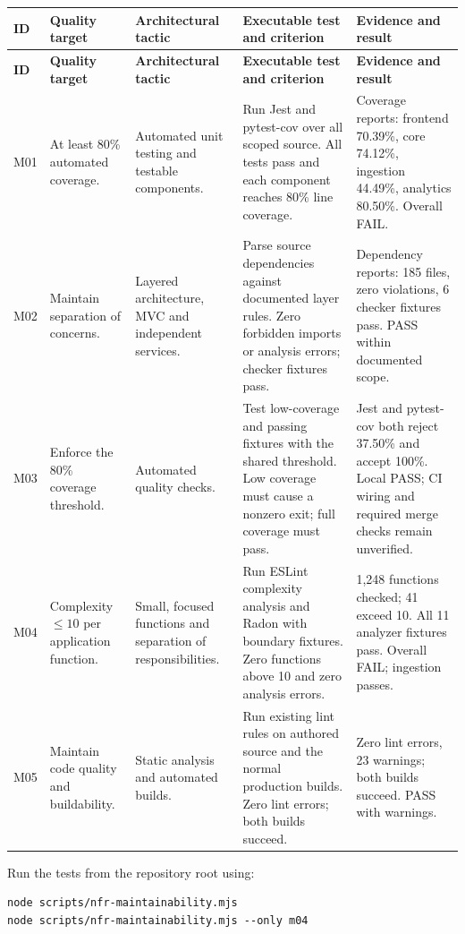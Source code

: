 \documentclass[12pt, a4paper]{article}
\begin{document}
\renewcommand{\arraystretch}{1.3}
\begin{longtable}{|p{}|p{}|p{}|p{}|p{}|}
\hline
\textbf{ID} & \textbf{Quality target} & \textbf{Architectural tactic} & \textbf{Executable test and criterion} & \textbf{Evidence and result} \\ \hline
\endfirsthead
\hline
\textbf{ID} & \textbf{Quality target} & \textbf{Architectural tactic} & \textbf{Executable test and criterion} & \textbf{Evidence and result} \\ \hline
\endhead
M01 & At least 80\% automated coverage. & Automated unit testing and testable components. & Run Jest and pytest-cov over all scoped source. All tests pass and each component reaches 80\% line coverage. & Coverage reports: frontend 70.39\%, core 74.12\%, ingestion 44.49\%, analytics 80.50\%. Overall FAIL. \\ \hline
M02 & Maintain separation of concerns. & Layered architecture, MVC and independent services. & Parse source dependencies against documented layer rules. Zero forbidden imports or analysis errors; checker fixtures pass. & Dependency reports: 185 files, zero violations, 6 checker fixtures pass. PASS within documented scope. \\ \hline
M03 & Enforce the 80\% coverage threshold. & Automated quality checks. & Test low-coverage and passing fixtures with the shared threshold. Low coverage must cause a nonzero exit; full coverage must pass. & Jest and pytest-cov both reject 37.50\% and accept 100\%. Local PASS; CI wiring and required merge checks remain unverified. \\ \hline
M04 & Complexity $\leq 10$ per application function. & Small, focused functions and separation of responsibilities. & Run ESLint complexity analysis and Radon with boundary fixtures. Zero functions above 10 and zero analysis errors. & 1,248 functions checked; 41 exceed 10. All 11 analyzer fixtures pass. Overall FAIL; ingestion passes. \\ \hline
M05 & Maintain code quality and buildability. & Static analysis and automated builds. & Run existing lint rules on authored source and the normal production builds. Zero lint errors; both builds succeed. & Zero lint errors, 23 warnings; both builds succeed. PASS with warnings. \\ \hline
\end{longtable}

Run the tests from the repository root using:
\begin{verbatim}
node scripts/nfr-maintainability.mjs
node scripts/nfr-maintainability.mjs --only m04
\end{verbatim}
\end{document}
